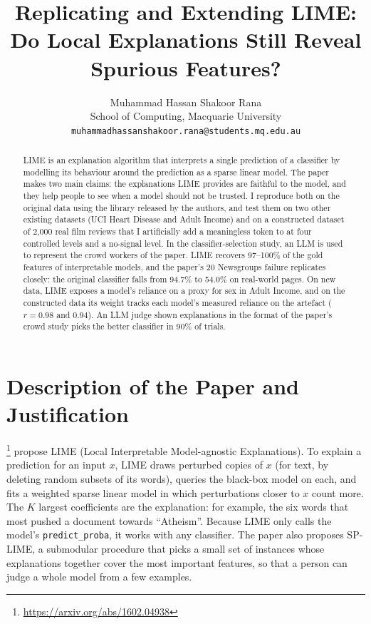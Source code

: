 \documentclass[11pt]{article}
\title{Replicating and Extending LIME:\\Do Local Explanations Still Reveal Spurious Features?}
\author{Muhammad Hassan Shakoor Rana \\
  School of Computing, Macquarie University \\
  \texttt{muhammadhassanshakoor.rana@students.mq.edu.au}}
\newcommand{\tok}[1]{\texttt{#1}}
\begin{document}
\maketitle

\begin{abstract}
LIME \citep{ribeiro2016why} is an explanation algorithm that interprets a single prediction of a classifier by modelling its behaviour around the prediction as a sparse linear model. The paper makes two main claims: the explanations LIME provides are faithful to the model, and they help people to see when a model should not be trusted. I reproduce both on the original data using the library released by the authors, and test them on two other existing datasets (UCI Heart Disease and Adult Income) and on a constructed dataset of 2,000 real film reviews that I artificially add a meaningless token to at four controlled levels and a no-signal level. In the classifier-selection study, an LLM is used to represent the crowd workers of the paper. LIME recovers 97--100\% of the gold features of interpretable models, and the paper's 20 Newsgroups failure replicates closely: the original classifier falls from 94.7\% to 54.0\% on real-world pages. On new data, LIME exposes a model's reliance on a proxy for sex in Adult Income, and on the constructed data its weight tracks each model's measured reliance on the artefact ($r = 0.98$ and $0.94$). An LLM judge shown explanations in the format of the paper's crowd study picks the better classifier in 90\% of trials.

\end{abstract}

\section{Description of the Paper and Justification}
\label{sec:paper}

\citet{ribeiro2016why}\footnote{\url{https://arxiv.org/abs/1602.04938}} propose LIME (Local Interpretable Model-agnostic Explanations). To explain a prediction for an input $x$, LIME draws perturbed copies of $x$ (for text, by deleting random subsets of its words), queries the black-box model on each, and fits a weighted sparse linear model in which perturbations closer to $x$ count more. The $K$ largest coefficients are the explanation: for example, the six words that most pushed a document towards ``Atheism''. Because LIME only calls the model's \tok{predict\_proba}, it works with any classifier. The paper also proposes SP-LIME, a submodular procedure that picks a small set of instances whose explanations together cover the most important features, so that a person can judge a whole model from a few examples.
\end{document}
